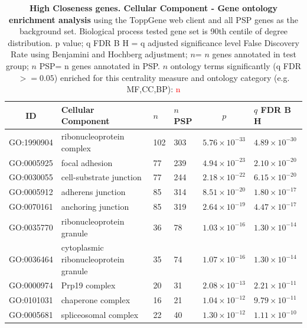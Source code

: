 \begin{table}[ht]
\centering
\begin{adjustbox}{width=\textwidth}
\setlength{\extrarowheight}{2pt}
\begin{tabular}{@{}clllcl@{}}
  \toprule
  ID & Cellular Component & $n$ & $n$ PSP & $p$ & $q$ FDR B H \\ 

  \midrule
GO:1990904 & ribonucleoprotein complex & 102 & 303 & $5.76 \times 10^{-33}$ & $4.89 \times 10^{-30}$ \\ 
  GO:0005925 & focal adhesion & 77 & 239 & $4.94 \times 10^{-23}$ & $2.10 \times 10^{-20}$ \\ 
  GO:0030055 & cell-substrate junction & 77 & 244 & $2.18 \times 10^{-22}$ & $6.15 \times 10^{-20}$ \\ 
  GO:0005912 & adherens junction & 85 & 314 & $8.51 \times 10^{-20}$ & $1.80 \times 10^{-17}$ \\ 
  GO:0070161 & anchoring junction & 85 & 319 & $2.64 \times 10^{-19}$ & $4.47 \times 10^{-17}$ \\ 
  GO:0035770 & ribonucleoprotein granule & 36 & 78 & $1.03 \times 10^{-16}$ & $1.30 \times 10^{-14}$ \\ 
  GO:0036464 & cytoplasmic ribonucleoprotein granule & 35 & 74 & $1.07 \times 10^{-16}$ & $1.30 \times 10^{-14}$ \\ 
  GO:0000974 & Prp19 complex & 20 & 31 & $2.08 \times 10^{-13}$ & $2.21 \times 10^{-11}$ \\ 
  GO:0101031 & chaperone complex & 16 & 21 & $1.04 \times 10^{-12}$ & $9.79 \times 10^{-11}$ \\ 
  GO:0005681 & spliceosomal complex & 22 & 40 & $1.30 \times 10^{-12}$ & $1.11 \times 10^{-10}$ \\ 
   \bottomrule
\end{tabular}
\end{adjustbox}
\caption[Gene ontology enrichment High Closeness genes Cellular Component of genes above 90th centile of distribution]{\textbf{High Closeness genes. Cellular Component - Gene ontology enrichment analysis} using the ToppGene web client and all PSP genes as the background set.  Biological process tested gene set is 90th centile of degree distribution.  p value; q FDR B H = q adjusted significance level False Discovery Rate using Benjamini and Hochberg adjustment; $n$= $n$ genes annotated in test group; $n$ PSP= n genes annotated in PSP. $n$ ontology terms significantly (q FDR$>=0.05$) enriched for this centrality measure and ontology category (e.g. MF,CC,BP): \textcolor{red}{n}} 

\label{tab:ToppGENE GO: Cellular Component. clo 90 centile cwpsp.txtp = p value; q FDR B H = q adjusted significance level False Discovery Rate using Benjamini and Hochberg adjustment; n= n genes annotated in test group; n PSP= n genes annotated in PSP}
\end{table}






